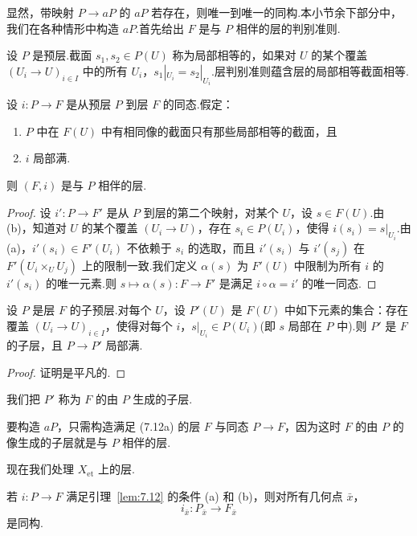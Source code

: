 显然，带映射 $P \to aP$ 的 $aP$ 若存在，则唯一到唯一的同构.本小节余下部分中，我们在各种情形中构造 $aP$.首先给出 $F$ 是与 $P$ 相伴的层的判别准则.

设 $P$ 是预层.截面 $s_1, s_2 \in P(U)$ 称为局部相等的，如果对 $U$ 的某个覆盖 $(U_i \to U)_{i \in I}$ 中的所有 $U_i$，$s_1|_{U_i} = s_2|_{U_i}$.层判别准则蕴含层的局部相等截面相等.

\begin{lemma}\label{lem:7.12}
设 $i \colon P \to F$ 是从预层 $P$ 到层 $F$ 的同态.假定：
\begin{enumerate}
  \item $P$ 中在 $F(U)$ 中有相同像的截面只有那些局部相等的截面，且
  \item $i$ 局部满.
\end{enumerate}
则 $(F, i)$ 是与 $P$ 相伴的层.
\end{lemma}

\begin{proof}
设 $i' \colon P \to F'$ 是从 $P$ 到层的第二个映射，对某个 $U$，设 $s \in F(U)$.由 (b)，知道对 $U$ 的某个覆盖 $(U_i \to U)$，存在 $s_i \in P(U_i)$，使得 $i(s_i) = s|_{U_i}$.由 (a)，$i'(s_i) \in F'(U_i)$ 不依赖于 $s_i$ 的选取，而且 $i'(s_i)$ 与 $i'(s_j)$ 在 $F'(U_i \times_{U} U_j)$ 上的限制一致.我们定义 $\alpha(s)$ 为 $F'(U)$ 中限制为所有 $i$ 的 $i'(s_i)$ 的唯一元素.则 $s \mapsto \alpha(s) \colon F \to F'$ 是满足 $i \circ \alpha = i'$ 的唯一同态.
\end{proof}

\begin{lemma}\label{lem:7.13}
设 $P$ 是层 $F$ 的子预层.对每个 $U$，设 $P'(U)$ 是 $F(U)$ 中如下元素的集合：存在覆盖 $(U_i \to U)_{i \in I}$，使得对每个 $i$，$s|_{U_i} \in P(U_i)$(即 $s$ 局部在 $P$ 中).则 $P'$ 是 $F$ 的子层，且 $P \to P'$ 局部满.
\end{lemma}

\begin{proof}
证明是平凡的.
\end{proof}

我们把 $P'$ 称为 $F$ 的由 $P$ 生成的子层.

要构造 $aP$，只需构造满足 (7.12a) 的层 $F$ 与同态 $P \to F$，因为这时 $F$ 的由 $P$ 的像生成的子层就是与 $P$ 相伴的层.

现在我们处理 $X_{\mathrm{et}}$ 上的层.

\begin{lemma}\label{lem:7.14}
若 $i \colon P \to F$ 满足引理~\ref{lem:7.12} 的条件 (a) 和 (b)，则对所有几何点 $\bar{x}$，
\[
i_{\bar{x}} \colon P_{\bar{x}} \to F_{\bar{x}}
\]
是同构.
\end{lemma}

